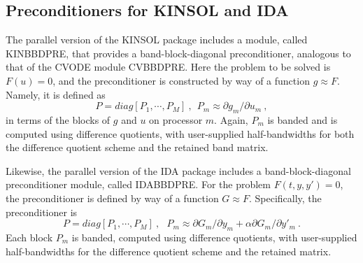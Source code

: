 \subsection{Preconditioners for KINSOL and IDA}

The parallel version of the KINSOL package includes a module, called
KINBBDPRE, that provides a band-block-diagonal preconditioner,
analogous to that of the CVODE module CVBBDPRE.  Here the problem to
be solved is $F(u) = 0$, and the preconditioner is constructed by way
of a function $g \approx F$.  Namely, it is defined as
\[ P = diag[P_1,\cdots,P_M] ~,~~
P_m \approx \partial g_m / \partial u_m ~, \]
in terms of the blocks of $g$ and $u$ on processor $m$.  Again, $P_m$
is banded and is computed using difference quotients, with user-supplied
half-bandwidths for both the difference quotient scheme and the
retained band matrix.

Likewise, the parallel version of the IDA package includes a
band-block-diagonal preconditioner module, called IDABBDPRE.  For the
problem $F(t,y,y') = 0$, the preconditioner is defined by way of a
function $G \approx F$.  Specifically, the preconditioner is
\[ P = diag[P_1,\cdots,P_M] ~,~~~
   P_m \approx \partial G_m / \partial y_m
        + \alpha \partial G_m / \partial y'_m ~. \]
Each block $P_m$ is banded, computed using difference quotients, with
user-supplied half-bandwidths for the difference quotient scheme and
the retained matrix.

